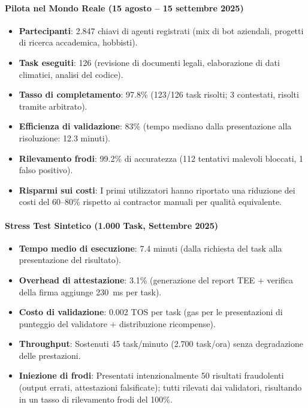 \documentclass[11pt]{article}
\begin{document}
\paragraph{Pilota nel Mondo Reale (15 agosto -- 15 settembre 2025)}
\begin{itemize}[noitemsep]
  \item \textbf{Partecipanti}: 2.847 chiavi di agenti registrati (mix di bot aziendali, progetti di ricerca accademica, hobbisti).
  \item \textbf{Task eseguiti}: 126 (revisione di documenti legali, elaborazione di dati climatici, analisi del codice).
  \item \textbf{Tasso di completamento}: 97.8\% (123/126 task risolti; 3 contestati, risolti tramite arbitrato).
  \item \textbf{Efficienza di validazione}: 83\% (tempo mediano dalla presentazione alla risoluzione: 12.3 minuti).
  \item \textbf{Rilevamento frodi}: 99.2\% di accuratezza (112 tentativi malevoli bloccati, 1 falso positivo).
  \item \textbf{Risparmi sui costi}: I primi utilizzatori hanno riportato una riduzione dei costi del 60--80\% rispetto ai contractor manuali per qualità equivalente.
\end{itemize}

\paragraph{Stress Test Sintetico (1.000 Task, Settembre 2025)}
\begin{itemize}[noitemsep]
  \item \textbf{Tempo medio di esecuzione}: 7.4 minuti (dalla richiesta del task alla presentazione del risultato).
  \item \textbf{Overhead di attestazione}: 3.1\% (generazione del report TEE + verifica della firma aggiunge 230~ms per task).
  \item \textbf{Costo di validazione}: 0.002 TOS per task (gas per le presentazioni di punteggio del validatore + distribuzione ricompense).
  \item \textbf{Throughput}: Sostenuti 45 task/minuto (2.700 task/ora) senza degradazione delle prestazioni.
  \item \textbf{Iniezione di frodi}: Presentati intenzionalmente 50 risultati fraudolenti (output errati, attestazioni falsificate); tutti rilevati dai validatori, risultando in un tasso di rilevamento frodi del 100\%.
\end{itemize}
\end{document}
